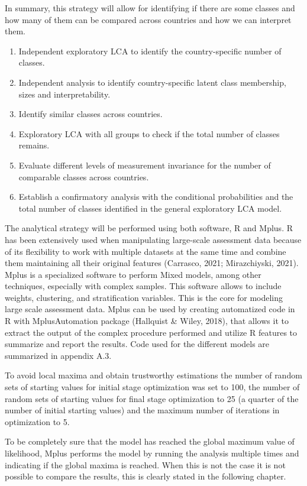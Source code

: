 \documentclass[12pt,a4paper,oneside]{reedthesis}
\providecommand{\tightlist}{%
  \setlength{\itemsep}{0pt}\setlength{\parskip}{0pt}}
\begin{document}
In summary, this strategy will allow for identifying if there are some classes and how many of them can be compared across countries and how we can interpret them.
\begin{enumerate}
\def\labelenumi{\arabic{enumi}.}
\tightlist
\item
  Independent exploratory LCA to identify the country-specific number of classes.
\item
  Independent analysis to identify country-specific latent class membership, sizes and interpretability.
\item
  Identify similar classes across countries.
\item
  Exploratory LCA with all groups to check if the total number of classes remains.
\item
  Evaluate different levels of measurement invariance for the number of comparable classes across countries.
\item
  Establish a confirmatory analysis with the conditional probabilities and the total number of classes identified in the general exploratory LCA model.
\end{enumerate}
The analytical strategy will be performed using both software, R and Mplus. R has been extensively used when manipulating large-scale assessment data because of its flexibility to work with multiple datasets at the same time and combine them maintaining all their original features (Carrasco, 2021; Mirazchiyski, 2021). Mplus is a specialized software to perform Mixed models, among other techniques, especially with complex samples. This software allows to include weights, clustering, and stratification variables. This is the core for modeling large scale assessment data. Mplus can be used by creating automatized code in R with MplusAutomation package (Hallquist \& Wiley, 2018), that allows it to extract the output of the complex procedure performed and utilize R features to summarize and report the results. Code used for the different models are summarized in appendix A.3.

To avoid local maxima and obtain trustworthy estimations the number of random sets of starting values for initial stage optimization was set to 100, the number of random sets of starting values for final stage optimization to 25 (a quarter of the number of initial starting values) and the maximum number of iterations in optimization to 5.

To be completely sure that the model has reached the global maximum value of likelihood, Mplus performs the model by running the analysis multiple times and indicating if the global maxima is reached. When this is not the case it is not possible to compare the results, this is clearly stated in the following chapter.
\end{document}
